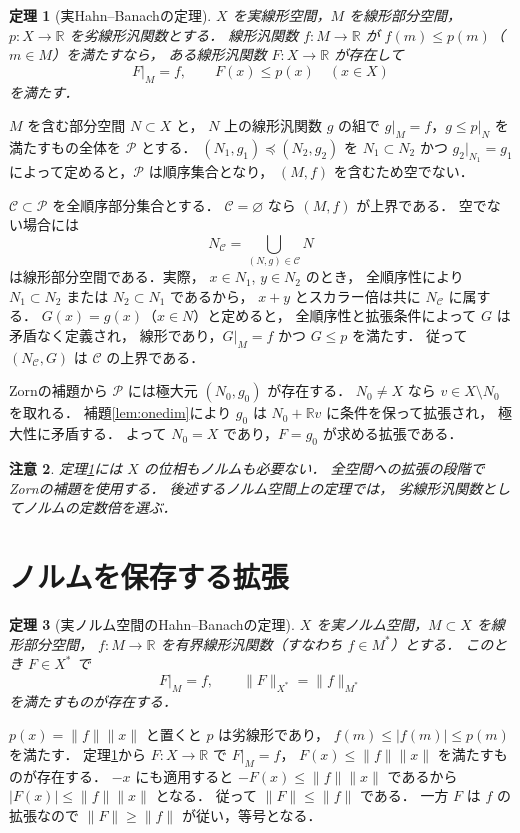 \documentclass[a5paper,10pt,onecolumn]{jsarticle}
\makeatletter
\theoremstyle{mathnotetheorem}
\newtheorem{theorem}{定理}[section]
\newtheorem{remark}[theorem]{注意}
\renewcommand{\proofname}{証明}
\renewenvironment{proof}[1][\proofname]{%
  \par\pushQED{\qed}\normalfont\topsep4\p@\@plus2\p@\relax
  \trivlist\item[\hskip\labelsep\bfseries #1]\ignorespaces
}{\popQED\endtrivlist\@endpefalse}
\makeatother
\begin{document}
\begin{theorem}[実Hahn--Banachの定理]\label{thm:hb-real}
$X$ を実線形空間，$M$ を線形部分空間，
$p:X\to\mathbb R$ を劣線形汎関数とする．
線形汎関数 $f:M\to\mathbb R$ が
$f(m)\le p(m)$（$m\in M$）を満たすなら，
ある線形汎関数 $F:X\to\mathbb R$ が存在して
\[
 F|_M=f,\qquad F(x)\le p(x)\quad(x\in X)
\]
を満たす．
\end{theorem}
\begin{proof}
$M$ を含む部分空間 $N\subset X$ と，
$N$ 上の線形汎関数 $g$ の組で
$g|_M=f$，$g\le p|_N$ を満たすもの全体を
$\mathcal P$ とする．
$(N_1,g_1)\preceq(N_2,g_2)$ を
$N_1\subset N_2$ かつ $g_2|_{N_1}=g_1$
によって定めると，$\mathcal P$ は順序集合となり，
$(M,f)$ を含むため空でない．

$\mathcal C\subset\mathcal P$ を全順序部分集合とする．
$\mathcal C=\varnothing$ なら $(M,f)$ が上界である．
空でない場合には
\[
 N_\mathcal C=\bigcup_{(N,g)\in\mathcal C}N
\]
は線形部分空間である．実際，
$x\in N_1$, $y\in N_2$ のとき，
全順序性により $N_1\subset N_2$ または
$N_2\subset N_1$ であるから，
$x+y$ とスカラー倍は共に $N_\mathcal C$ に属する．
$G(x)=g(x)$（$x\in N$）と定めると，
全順序性と拡張条件によって $G$ は矛盾なく定義され，
線形であり，$G|_M=f$ かつ $G\le p$ を満たす．
従って $(N_\mathcal C,G)$ は $\mathcal C$ の上界である．

Zornの補題から $\mathcal P$ には極大元 $(N_0,g_0)$ が存在する．
$N_0\ne X$ なら $v\in X\setminus N_0$ を取れる．
補題\ref{lem:onedim}により $g_0$ は
$N_0+\mathbb Rv$ に条件を保って拡張され，
極大性に矛盾する．
よって $N_0=X$ であり，$F=g_0$ が求める拡張である．
\end{proof}

\begin{remark}
定理\ref{thm:hb-real}には $X$ の位相もノルムも必要ない．
全空間への拡張の段階でZornの補題を使用する．
後述するノルム空間上の定理では，
劣線形汎関数としてノルムの定数倍を選ぶ．
\end{remark}

\section{ノルムを保存する拡張}

\begin{theorem}[実ノルム空間のHahn--Banachの定理]
$X$ を実ノルム空間，$M\subset X$ を線形部分空間，
$f:M\to\mathbb R$ を有界線形汎関数（すなわち $f\in M^*$）とする．
このとき $F\in X^*$ で
\[
 F|_M=f,\qquad \|F\|_{X^*}=\|f\|_{M^*}
\]
を満たすものが存在する．
\end{theorem}
\begin{proof}
$p(x)=\|f\|\|x\|$ と置くと $p$ は劣線形であり，
$f(m)\le|f(m)|\le p(m)$ を満たす．
定理\ref{thm:hb-real}から
$F:X\to\mathbb R$ で $F|_M=f$，
$F(x)\le\|f\|\|x\|$ を満たすものが存在する．
$-x$ にも適用すると
$-F(x)\le\|f\|\|x\|$ であるから
$|F(x)|\le\|f\|\|x\|$ となる．
従って $\|F\|\le\|f\|$ である．
一方 $F$ は $f$ の拡張なので
$\|F\|\ge\|f\|$ が従い，等号となる．
\end{proof}
\end{document}

